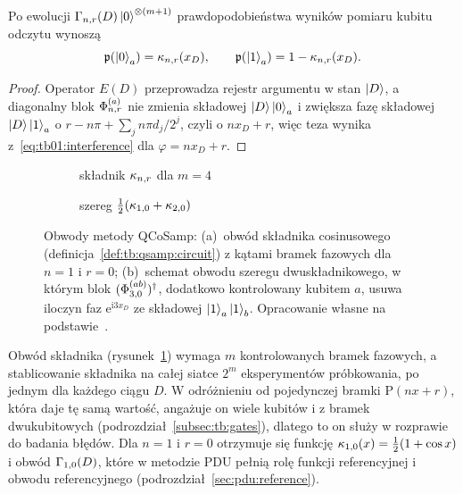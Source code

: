 \begin{Theorem}\label{thm:tb:qsamp:readout}
Po ewolucji $\Gamma_{n,r}(D)\ket{0}^{\otimes(m+1)}$ prawdopodobieństwa wyników pomiaru kubitu odczytu wynoszą
\begin{equation}\label{eq:tb:qsamp:readout}
\mathfrak{p}(\ket{0}_a)=\kappa_{n,r}(x_D),\qquad \mathfrak{p}(\ket{1}_a)=1-\kappa_{n,r}(x_D).
\end{equation}
\end{Theorem}
\begin{proof}
Operator $E(D)$ przeprowadza rejestr argumentu w stan $\ket{D}$, a diagonalny blok $\Phi^{(a)}_{n,r}$ nie zmienia składowej $\ket{D}\ket{0}_a$ i zwiększa fazę składowej $\ket{D}\ket{1}_a$ o $r-n\pi+\sum_{j}n\pi d_j/2^{j}$, czyli o $nx_D+r$, więc teza wynika z~\eqref{eq:tb01:interference} dla $\varphi=nx_D+r$.
\end{proof}

\begin{figure}[htbp]
\centering
\begin{subfigure}[b]{0.58\textwidth}
\centering

\caption{składnik $\kappa_{n,r}$ dla $m=4$}
\label{fig:tb:qsamp:component}
\end{subfigure}\hfill
\begin{subfigure}[b]{0.39\textwidth}
\centering

\caption{szereg $\tfrac{1}{2}(\kappa_{1,0}+\kappa_{2,0})$}
\label{fig:tb:qsamp:two-components}
\end{subfigure}
\caption{Obwody metody QCoSamp: (a)~obwód składnika cosinusowego (definicja~\ref{def:tb:qsamp:circuit}) z kątami bramek fazowych dla $n=1$ i $r=0$; (b)~schemat obwodu szeregu dwuskładnikowego, w którym blok $(\Phi^{(ab)}_{3,0})^{\dagger}$, dodatkowo kontrolowany kubitem $a$, usuwa iloczyn faz $\mathrm{e}^{\mathrm{i}3x_D}$ ze składowej $\ket{1}_a\ket{1}_b$.
Opracowanie własne na podstawie~\cite{wereszczynski_cosine_2020,werner_magisterka_2022}.}
\label{fig:tb:qsamp:circuits}
\end{figure}

Obwód składnika (rysunek~\ref{fig:tb:qsamp:component}) wymaga $m$ kontrolowanych bramek fazowych, a stablicowanie składnika na całej siatce $2^{m}$ eksperymentów próbkowania, po jednym dla każdego ciągu $D$.
W odróżnieniu od pojedynczej bramki $\mathrm{P}(nx+r)$, która daje tę samą wartość, angażuje on wiele kubitów i  z bramek dwukubitowych (podrozdział~\ref{subsec:tb:gates}), dlatego to on służy w rozprawie do badania błędów.
Dla $n=1$ i $r=0$ otrzymuje się funkcję $\kappa_{1,0}(x)=\tfrac{1}{2}(1+\cos x)$ i obwód $\Gamma_{1,0}(D)$, które w metodzie PDU pełnią rolę funkcji referencyjnej i obwodu referencyjnego (podrozdział~\ref{sec:pdu:reference}).

